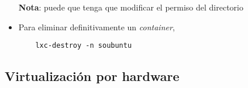 \begin{questions}
\begin{itemize}
  \textbf{Nota}: puede que tenga que modificar el permiso del directorio
  
\item Para eliminar definitivamente un \textit{container},
\begin{verbatim}
   	lxc-destroy -n soubuntu
\end{verbatim}
  
\end{itemize}

\subsection{Virtualización por hardware}

\end{questions}